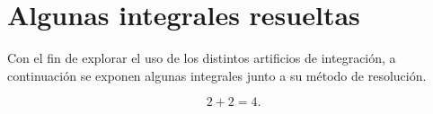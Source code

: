 \section{Algunas integrales resueltas}
Con el fin de explorar el uso de los distintos artificios de integración, a continuación se exponen algunas integrales junto a su método de resolución.

$$2+2=4.$$
